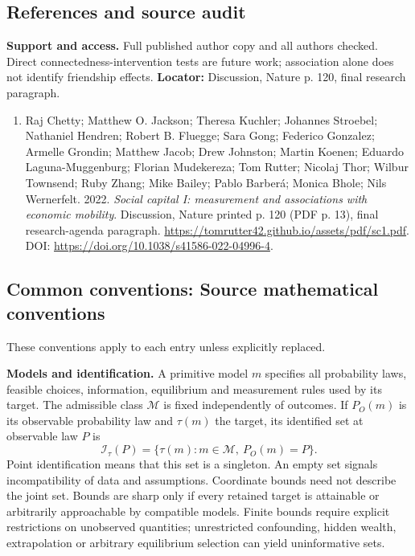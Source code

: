 \documentclass[11pt,a4paper]{article}
\begin{document}
\subsection*{References and source audit}
\textbf{Support and access.} Full published author copy and all authors checked. Direct connectedness-intervention tests are future work; association alone does not identify friendship effects. \textbf{Locator:} Discussion, Nature p. 120, final research paragraph.
\begin{enumerate}\raggedright
\item\hypertarget{definitions:source:30007648:1}{} Raj Chetty; Matthew O. Jackson; Theresa Kuchler; Johannes Stroebel; Nathaniel Hendren; Robert B. Fluegge; Sara Gong; Federico Gonzalez; Armelle Grondin; Matthew Jacob; Drew Johnston; Martin Koenen; Eduardo Laguna-Muggenburg; Florian Mudekereza; Tom Rutter; Nicolaj Thor; Wilbur Townsend; Ruby Zhang; Mike Bailey; Pablo Barberá; Monica Bhole; Nils Wernerfelt. 2022. \emph{Social capital I: measurement and associations with economic mobility}. Discussion, Nature printed p. 120 (PDF p. 13), final research-agenda paragraph.
\url{https://tomrutter42.github.io/assets/pdf/sc1.pdf}.
DOI: \url{https://doi.org/10.1038/s41586-022-04996-4}.
\end{enumerate}

\subsection*{Common conventions: Source mathematical conventions}

These conventions apply to each entry unless explicitly replaced.

\textbf{Models and identification.} A primitive model \(m\) specifies all probability laws, feasible choices, information, equilibrium and measurement rules used by its target. The admissible class \(\mathcal M\) is fixed independently of outcomes. If \(P_O(m)\) is its observable probability law and \(\tau(m)\) the target, its identified set at observable law \(P\) is
\[
 \mathcal I_\tau(P)=\{\tau(m):m\in\mathcal M,\ P_O(m)=P\}.
\]
Point identification means that this set is a singleton. An empty set signals incompatibility of data and assumptions. Coordinate bounds need not describe the joint set. Bounds are sharp only if every retained target is attainable or arbitrarily approachable by compatible models. Finite bounds require explicit restrictions on unobserved quantities; unrestricted confounding, hidden wealth, extrapolation or arbitrary equilibrium selection can yield uninformative sets.
\end{document}
